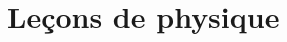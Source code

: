 



%

\tableofcontents
\newpage



\chapter{Leçons de physique} \newpage

%
%

%
%
%
%
%
%
%
%
%
%
%
%
%
%
%
%
%
%
%
%
%
%


%
%
%
%
%
%
%
%
%
%
%
%
%
%
%
%
%
%
%

\appendix

%



